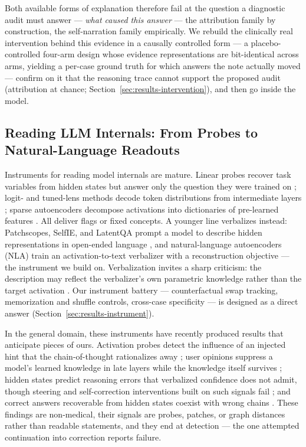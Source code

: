 Both available forms of explanation therefore fail at the question a
diagnostic audit must answer --- \emph{what caused this answer} --- the
attribution family by construction, the self-narration family empirically.
We rebuild the clinically real intervention behind this evidence in a
causally controlled form --- a placebo-controlled four-arm design whose
evidence representations are bit-identical across arms, yielding a per-case
ground truth for which answers the note actually moved --- confirm on it
that the reasoning trace cannot support the proposed audit (attribution at
chance; Section~\ref{sec:results-intervention}), and then go inside the
model.

\subsection{Reading LLM Internals: From Probes to Natural-Language Readouts}
\label{sec:related-internals}

Instruments for reading model internals are mature. Linear probes recover
task variables from hidden states but answer only the question they were
trained on \cite{belinkov2022probing}; logit- and tuned-lens methods decode
token distributions from intermediate layers
\cite{nostalgebraist2020logitlens, belrose2023tunedlens}; sparse
autoencoders decompose activations into dictionaries of pre-learned
features \cite{cunningham2023sae, bricken2023monosemanticity}. All deliver
flags or fixed concepts. A younger line verbalizes instead: Patchscopes,
SelfIE, and LatentQA prompt a model to describe hidden representations in
open-ended language
\cite{ghandeharioun2024patchscopes, chen2024selfie, pan2024latentqa}, and
natural-language autoencoders (NLA) train an activation-to-text verbalizer
with a reconstruction objective \cite{anthropic2026nla} --- the instrument
we build on. Verbalization invites a sharp criticism: the description may
reflect the verbalizer's own parametric knowledge rather than the target
activation \cite{li2026privileged}. Our instrument battery ---
counterfactual swap tracking, memorization and shuffle controls, cross-case
specificity --- is designed as a direct answer
(Section~\ref{sec:results-instrument}).

In the general domain, these instruments have recently produced results
that anticipate pieces of ours. Activation probes detect the influence of
an injected hint that the chain-of-thought rationalizes away
\cite{rationalization2026}; user opinions suppress a model's learned
knowledge in late layers while the knowledge itself survives
\cite{truthoverridden2026}; hidden states predict reasoning errors that
verbalized confidence does not admit, though steering and self-correction
interventions built on such signals fail \cite{yuan2026hidden}; and correct
answers recoverable from hidden states coexist with wrong chains
\cite{mehrafarin2026hidden}. These findings are non-medical, their signals
are probes, patches, or graph distances rather than readable statements,
and they end at detection --- the one attempted continuation into
correction reports failure.

